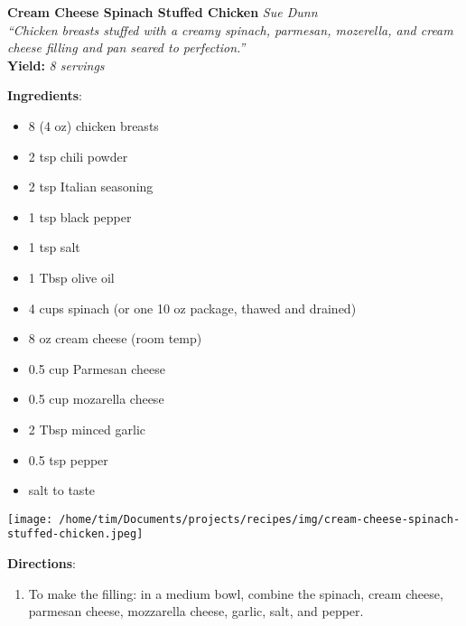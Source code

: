 \documentclass[11pt, twoside, openany]{book}
\begin{document}
\noindent\begin{minipage}[t]{\linewidth}%
{\Large\textbf{Cream Cheese Spinach Stuffed Chicken}} \label{cream-cheese-spinach-stuffed-chicken}\hfill\textit{Sue Dunn}\\
\textit{``Chicken breasts stuffed with a creamy spinach, parmesan, mozerella, and cream cheese filling and pan seared to perfection.''}\\
\textbf{Yield:} \textit{8 servings}\\
\noindent\begin{minipage}[t]{0.78\linewidth}%
\textbf{Ingredients}:\vspace{-3mm}
\begin{multicols}{2}
\begin{itemize}\setlength\itemsep{-1mm}
\item 8 (4 oz) chicken breasts
\item 2 tsp chili powder
\item 2 tsp Italian seasoning
\item 1 tsp black pepper
\item 1 tsp salt
\item 1 Tbsp olive oil
\item 4 cups spinach (or one 10 oz package, thawed and drained)
\item 8 oz cream cheese (room temp)
\item 0.5 cup Parmesan cheese
\item 0.5 cup mozarella cheese
\item 2 Tbsp minced garlic
\item 0.5 tsp pepper
\item salt to taste
\end{itemize}
\end{multicols}
\end{minipage}
\noindent\begin{minipage}[t]{0.18\linewidth}
\centering \strut\vspace*{-\baselineskip}\newline
\texttt{[image: /home/tim/Documents/projects/recipes/img/cream-cheese-spinach-stuffed-chicken.jpeg]}\\
\end{minipage}\vspace{3mm}
\textbf{Directions}:
\vspace{-3mm}\begin{enumerate}\setlength\itemsep{-1mm}
\item To make the filling: in a medium bowl, combine the spinach, cream cheese, parmesan cheese, mozzarella cheese, garlic, salt, and pepper.

\end{enumerate}
\end{minipage}
\end{document}
